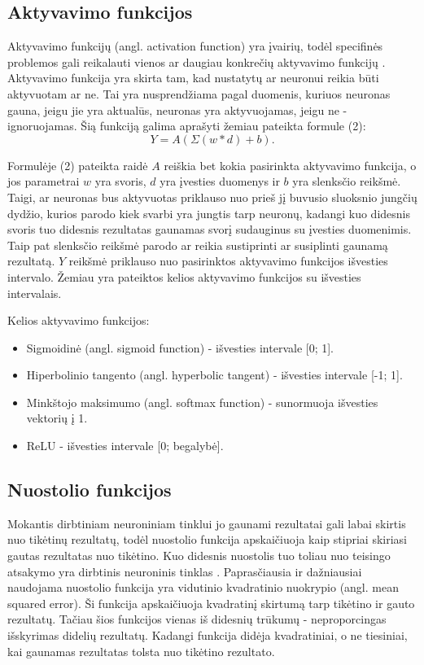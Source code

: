 \documentclass{VUMIFPSkursinis}
\begin{document}
\subsection{Aktyvavimo funkcijos}
Aktyvavimo funkcijų (angl. activation function) yra įvairių, todėl specifinės problemos gali reikalauti vienos ar daugiau konkrečių aktyvavimo funkcijų \cite{activation}.
Aktyvavimo funkcija yra skirta tam, kad nustatytų ar neuronui reikia būti aktyvuotam ar ne. Tai yra nusprendžiama pagal duomenis, kuriuos neuronas gauna, jeigu jie yra aktualūs, neuronas yra aktyvuojamas, jeigu ne - ignoruojamas.
Šią funkciją galima aprašyti žemiau pateikta formule (2):
\begin{equation}
Y = A(\Sigma{(w * d) + b}).
\end{equation}

Formulėje (2) pateikta raidė \(A\) reiškia bet kokia pasirinkta aktyvavimo funkcija, o jos parametrai \(w\) yra svoris, \(d\) yra įvesties duomenys ir \(b\) yra slenksčio reikšmė. Taigi, ar neuronas bus aktyvuotas priklauso nuo prieš jį 
buvusio sluoksnio jungčių dydžio, kurios parodo kiek svarbi yra jungtis tarp neuronų, kadangi kuo didesnis svoris tuo didesnis rezultatas gaunamas svorį sudauginus su įvesties duomenimis. Taip pat slenksčio reikšmė parodo ar reikia 
sustiprinti ar susiplinti gaunamą rezultatą. \(Y\) reikšmė priklauso nuo pasirinktos aktyvavimo funkcijos išvesties intervalo. Žemiau yra pateiktos kelios aktyvavimo funkcijos su išvesties intervalais.  

Kelios aktyvavimo funkcijos:
\begin{itemize}
\item Sigmoidinė (angl. sigmoid function) - išvesties intervale [0; 1].
\item Hiperbolinio tangento (angl. hyperbolic tangent) - išvesties intervale [-1; 1].
\item Minkštojo maksimumo (angl. softmax function) - sunormuoja išvesties vektorių į 1.
\item ReLU - išvesties intervale [0; begalybė].
\end{itemize}

\subsection{Nuostolio funkcijos}
Mokantis dirbtiniam neuroniniam tinklui jo gaunami rezultatai gali labai skirtis nuo tikėtinų rezultatų, todėl nuostolio funkcija apskaičiuoja kaip stipriai
skiriasi gautas rezultatas nuo tikėtino. Kuo didesnis nuostolis tuo toliau nuo teisingo atsakymo yra dirbtinis neuroninis tinklas \cite{Cameron-loss-fun}.
Paprasčiausia ir dažniausiai naudojama nuostolio funkcija yra vidutinio kvadratinio nuokrypio (angl. mean squared error). Ši funkcija apskaičiuoja kvadratinį skirtumą tarp tikėtino 
ir gauto rezultatų. Tačiau šios funkcijos vienas iš didesnių trūkumų - neproporcingas išskyrimas didelių rezultatų. Kadangi funkcija didėja kvadratiniai,
o ne tiesiniai, kai gaunamas rezultatas tolsta nuo tikėtino rezultato.
\end{document}
